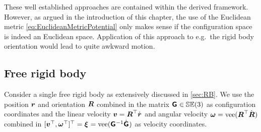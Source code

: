 These well established approaches are contained within the derived framework.
However, as argued in the introduction of this chapter, the use of the Euclidean metric \eqref{eq:EuclideanMetricPotential} only makes sense if the configuration space is indeed an Euclidean space.
Application of this approach to e.g.\ the rigid body orientation would lead to quite awkward motion.


\subsection{Free rigid body}\label{sec:CtrlApproachEnergySingleBody}
Consider a single free rigid body as extensively discussed in \autoref{sec:RB}.
We use the position $\boldsymbol{r}$ and orientation $\boldsymbol{R}$ combined in the matrix $\bodyHomoCoord{}{} \in \SpecialEuclideanGroup(3)$ as configuration coordinates and the linear velocity $\boldsymbol{v} = \boldsymbol{R}^\top \dot{\boldsymbol{r}}$ and angular velocity $\boldsymbol{\omega} = \operatorname{vee}(\boldsymbol{R}^\top \dot{\boldsymbol{R}})$ combined in $[\v^\top, \w^\top]^\top = \bodyVel{}{} = \veeOp(\bodyHomoCoord{}{}^{-1} \bodyHomoCoordd{}{})$ as velocity coordinates.

